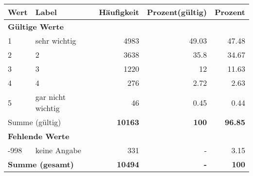      \begin{longtable}{lXrrr}
     \toprule
     \textbf{Wert} & \textbf{Label} & \textbf{Häufigkeit} & \textbf{Prozent(gültig)} & \textbf{Prozent} \\
     \endhead
     \midrule
     \multicolumn{5}{l}{\textbf{Gültige Werte}}\\

     1 &
     \multicolumn{1}{X}{ sehr wichtig   } &


       \num{4983} &
       \num[round-mode=places,round-precision=2]{49,03} &
         \num[round-mode=places,round-precision=2]{47,48} \\

     2 &
     \multicolumn{1}{X}{ 2   } &


       \num{3638} &
       \num[round-mode=places,round-precision=2]{35,8} &
         \num[round-mode=places,round-precision=2]{34,67} \\

     3 &
     \multicolumn{1}{X}{ 3   } &


       \num{1220} &
       \num[round-mode=places,round-precision=2]{12} &
         \num[round-mode=places,round-precision=2]{11,63} \\

     4 &
     \multicolumn{1}{X}{ 4   } &


       \num{276} &
       \num[round-mode=places,round-precision=2]{2,72} &
         \num[round-mode=places,round-precision=2]{2,63} \\

     5 &
     \multicolumn{1}{X}{ gar nicht wichtig   } &


       \num{46} &
       \num[round-mode=places,round-precision=2]{0,45} &
         \num[round-mode=places,round-precision=2]{0,44} \\
     \midrule
     \multicolumn{2}{l}{Summe (gültig)} &
       \textbf{\num{10163}} &
     \textbf{100} &
       \textbf{\num[round-mode=places,round-precision=2]{96,85}} \\
     \multicolumn{5}{l}{\textbf{Fehlende Werte}}\\
       -998 &
       keine Angabe &
         \num{331} &
        - &
         \num[round-mode=places,round-precision=2]{3,15} \\
     \midrule
     \multicolumn{2}{l}{\textbf{Summe (gesamt)}} &
          \textbf{\num{10494}} &
        \textbf{-} &
        \textbf{100} \\
     \bottomrule
     \end{longtable}
     
